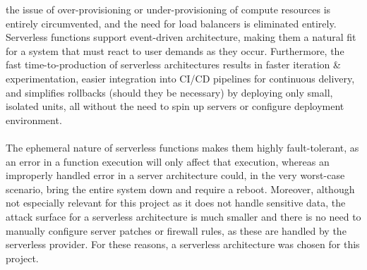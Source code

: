 \documentclass[a4paper,11pt]{report}
\begin{document}
the issue of over-provisioning or under-provisioning of compute resources is entirely circumvented, and the need for load balancers is eliminated entirely.
Serverless functions support event-driven architecture, making them a natural fit for a system that must react to user demands as they occur.
Furthermore, the fast time-to-production of serverless architectures results in faster iteration \& experimentation, easier integration into CI/CD pipelines for continuous delivery, and simplifies rollbacks (should they be necessary) by deploying only small, isolated units, all without the need to spin up servers or configure deployment environment.
\\\\
The ephemeral nature of serverless functions makes them highly fault-tolerant, as an error in a function execution will only affect that execution, whereas an improperly handled error in a server architecture could, in the very worst-case scenario, bring the entire system down and require a reboot.
Moreover, although not especially relevant for this project as it does not handle sensitive data, the attack surface for a serverless architecture is much smaller and there is no need to manually configure server patches or firewall rules, as these are handled by the serverless provider.
For these reasons, a serverless architecture was chosen for this project.
\end{document}
